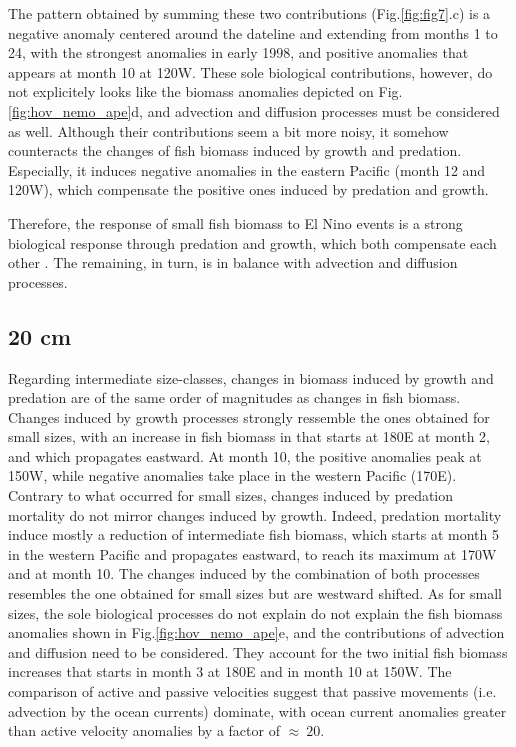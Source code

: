 The pattern obtained by summing these two contributions (Fig.\ref{fig:fig7}.c) is a negative anomaly centered around the dateline and extending from months 1 to 24, with the strongest anomalies in early 1998, and positive anomalies that appears at month 10 at 120\degree{}W. These sole biological contributions, however, do not explicitely looks like the biomass anomalies depicted on Fig.\ref{fig:hov_nemo_ape}d, and advection and diffusion processes must be considered as well. Although their contributions seem a bit more noisy, it somehow counteracts the changes of fish biomass induced by growth and predation. Especially, it induces negative anomalies in the eastern Pacific (month 12 and 120\degree{}W), which compensate the positive ones induced by predation and growth. 

Therefore, the response of small fish biomass to El Nino events is a strong biological response through predation and growth, which both compensate each other . The remaining, in turn, is in balance with advection and diffusion processes.

\subsection{20 cm}

Regarding intermediate size-classes, changes in biomass induced by growth and predation are of the same order of magnitudes as changes in fish biomass. Changes induced by growth processes strongly ressemble the ones obtained for small sizes, with an increase in fish biomass in that starts at 180\degree{}E at month 2, and which propagates eastward. At month 10, the positive anomalies peak at 150\degree{}W, while negative anomalies take place in the western Pacific (170\degree{}E). Contrary to what occurred for small sizes, changes induced by predation mortality do not mirror changes induced by growth. Indeed, predation mortality induce mostly a reduction of intermediate fish biomass, which starts at month 5 in the western Pacific and propagates eastward, to reach its maximum at 170\degree{}W and at month 10. The changes induced by the combination of both processes resembles the one obtained for small sizes but are westward shifted. As for small sizes, the sole biological processes do not explain do not explain the fish biomass anomalies shown in Fig.\ref{fig:hov_nemo_ape}e, and the contributions of advection and diffusion need to be considered. They account for the two initial fish biomass increases that starts in month 3 at 180\degree{}E and in month 10 at 150\degree{}W. The comparison of active and passive velocities suggest that passive movements (i.e. advection by the ocean currents) dominate, with ocean current anomalies greater than active velocity anomalies by a factor of $\approx\ 20$.

